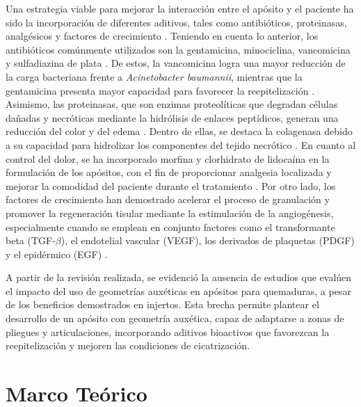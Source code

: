 \documentclass[../../DocumentoCompleto.tex]{subfiles}
\begin{document}
Una estrategia viable para mejorar la interacción entre el apósito y el paciente ha sido la incorporación de diferentes aditivos, tales como antibióticos, proteinasas, analgésicos y factores de crecimiento \cite{Rezvani2019}. Teniendo en cuenta lo anterior, los antibióticos comúnmente utilizados son la gentamicina, minociclina, vancomicina y sulfadiazina de plata \cite{Freitez2024}. De estos, la vancomicina logra una mayor reducción de la carga bacteriana frente a \textit{Acinetobacter baumannii}, mientras que la gentamicina presenta mayor capacidad para favorecer la reepitelización \cite{Nuutila2019}. Asimismo, las proteinasas, que son enzimas proteolíticas que degradan células dañadas y necróticas mediante la hidrólisis de enlaces peptídicos, generan una reducción del color y del edema \cite{DaSilva2017}. Dentro de ellas, se destaca la colagenasa debido a su capacidad para hidrolizar los componentes del tejido necrótico \cite{Patry2017}. En cuanto al control del dolor, se ha incorporado morfina y clorhidrato de lidocaína en la formulación de los apósitos, con el fin de proporcionar analgesia localizada y mejorar la comodidad del paciente durante el tratamiento \cite{Kowalski2024}. Por otro lado, los factores de crecimiento han demostrado acelerar el proceso de granulación y promover la regeneración tisular mediante la estimulación de la angiogénesis, especialmente cuando se emplean en conjunto factores como el transformante beta (TGF-$\beta$), el endotelial vascular (VEGF), los derivados de plaquetas (PDGF) y el epidérmico (EGF) \cite{Heydari2024}.

A partir de la revisión realizada, se evidenció la ausencia de estudios que evalúen el impacto del uso de geometrías auxéticas en apósitos para quemaduras, a pesar de los beneficios demostrados en injertos. Esta brecha permite plantear el desarrollo de un apósito con geometría auxética, capaz de adaptarse a zonas de pliegues y articulaciones, incorporando aditivos bioactivos que favorezcan la reepitelización y mejoren las condiciones de cicatrización.


\section{Marco Teórico}
\end{document}
